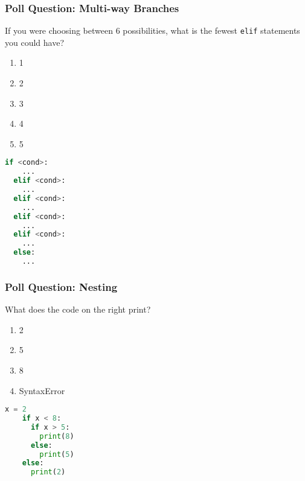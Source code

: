 \documentclass{beamer}
\begin{document}
%
%
\begin{frame}[fragile]
  \frametitle{Poll Question: Multi-way Branches}
  If you were choosing between 6 possibilities, what is the fewest \lstinline|elif| statements you could have?
  \vfill
  \begin{minipage}{0.49\textwidth}
    \begin{enumerate}[A]
      \item 1
      \item 2
      \item 3
      \item 4
      \item 5
    \end{enumerate}
  \end{minipage}
  \pause
  \begin{minipage}{0.49\textwidth}
    \begin{lstlisting}[language=Python, autogobble]
  if <cond>:
    ...
  elif <cond>:
    ...
  elif <cond>:
    ...
  elif <cond>:
    ...
  elif <cond>:
    ...
  else:
    ...
    \end{lstlisting}
  \end{minipage}
\end{frame}

%
%
\begin{frame}[fragile]
  \frametitle{Poll Question: Nesting}
  What does the code on the right print?
  \vfill
  \begin{minipage}{0.49\textwidth}
    \begin{enumerate}[A]
      \item 2
      \item 5
      \item 8
      \item SyntaxError
    \end{enumerate}
  \end{minipage}
  \pause
  \begin{minipage}{0.49\textwidth}
    \begin{lstlisting}[language=Python, autogobble]
    x = 2
    if x < 8:
      if x > 5:
        print(8)
      else:
        print(5)
    else:
      print(2)
    \end{lstlisting}
  \end{minipage}
\end{frame}

%
%
\end{document}
